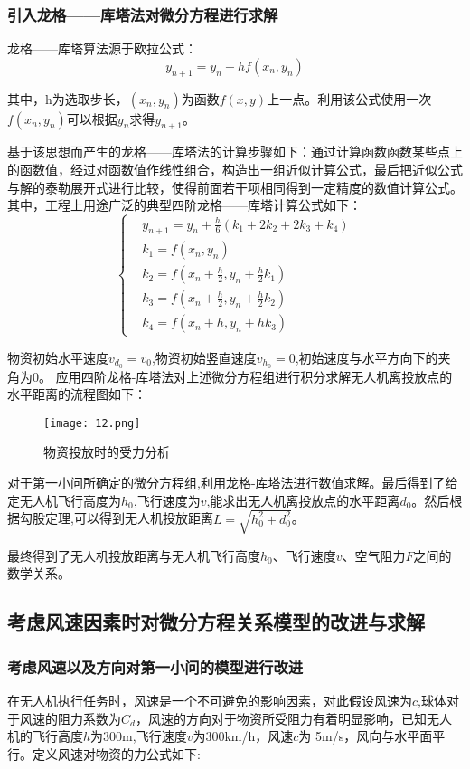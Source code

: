 \documentclass[normalsize]{ctexart}
\begin{document}
\subsubsection{引入龙格——库塔法对微分方程进行求解}
龙格——库塔算法源于欧拉公式：
\begin{equation}
	y_{n+1}=y_n+hf(x_n,y_n)
\end{equation}


其中，h为选取步长，$(x_n,y_n)$为函数$f(x,y)$上一点。利用该公式使用一次$f(x_n,y_n)$可以根据$y_n$求得$y_{n+1}$。
\par 基于该思想而产生的龙格——库塔法的计算步骤如下：通过计算函数函数某些点上的函数值，经过对函数值作线性组合，构造出一组近似计算公式，最后把近似公式与解的泰勒展开式进行比较，使得前面若干项相同得到一定精度的数值计算公式。\cite{ref2}其中，工程上用途广泛的典型四阶龙格——库塔计算公式如下：
\begin{equation}
	\begin{cases}
		& y_{n+1}=y_n+\frac{h}{6}(k_1+2k_2+2k_3+k_4)\\
		& k_1=f(x_n,y_n)\\
		& k_2=f(x_n+\frac{h}{2},y_n+\frac{h}{2}k_1)\\
		& k_3=f(x_n+\frac{h}{2},y_n+\frac{h}{2}k_2)\\
		& k_4=f(x_n+h,y_n+hk_3)
	\end{cases}
\end{equation}
\par  物资初始水平速度$v_d_0=v_0$,物资初始竖直速度$v_h_0=0$,初始速度与水平方向下的夹角为0。
应用四阶龙格-库塔法对上述微分方程组进行积分求解无人机离投放点的水平距离的流程图如下：
\begin{figure}[h]
	
	\centering
	\texttt{[image: 12.png]}
	\caption{物资投放时的受力分析}
	
\end{figure}
\par 对于第一小问所确定的微分方程组,利用龙格-库塔法进行数值求解。最后得到了给定无人机飞行高度为$h_0$,飞行速度为$v$,能求出无人机离投放点的水平距离$d_0$。然后根据勾股定理,可以得到无人机投放距离$L=\sqrt{h_0^2+d_0^2}$。
\par
最终得到了无人机投放距离与无人机飞行高度$h_0$、飞行速度$v$、空气阻力$F$之间的数学关系。
\subsection{考虑风速因素时对微分方程关系模型的改进与求解}
\subsubsection{考虑风速以及方向对第一小问的模型进行改进}
在无人机执行任务时，风速是一个不可避免的影响因素，对此假设风速为$c$,球体对于风速的阻力系数为$C_d$，风速的方向对于物资所受阻力有着明显影响，已知无人机的飞行高度$h$为300m,飞行速度$v$为300km/h，风速$c$为 5m/s，风向与水平面平行。定义风速对物资的力公式如下:
\end{document}
